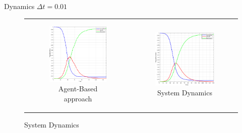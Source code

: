 \documentclass{beamer}
\begin{document}
\begin{frame}{Dynamics $\Delta t = 0.01$}
\begin{figure}
\begin{center}
	\begin{tabular}{c c}
		\begin{subfigure}[b]{0.4\textwidth}
			\centering
			\includegraphics[width=0.95\textwidth, angle=0]{./fig/SIR_Yampa_dt001.png}
			\caption{Agent-Based approach}
		\end{subfigure}
    	
    	&
  
		\begin{subfigure}[b]{0.4\textwidth}
			\centering
			\includegraphics[width=1\textwidth, angle=0]{./fig/SIR_SD_001dt.png}
			\caption{System Dynamics}
		\end{subfigure}
	\end{tabular}
\end{center}
\end{figure}
\end{frame}
\end{document}
